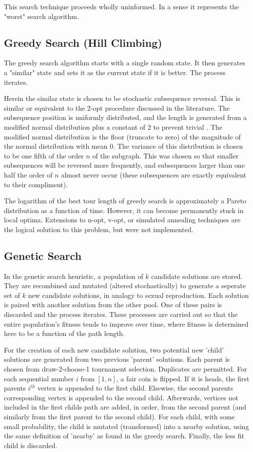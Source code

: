 \documentclass[10pt, conference, compsocconf]{IEEEtran}
\begin{document}
This search technique proceeds wholly uninformed. In a sense it represents the "worst" search algorithm.

\subsection{Greedy Search (Hill Climbing)}
The greedy search algorithm starts with a single random state. It then generates a "similar" state and sets it as the current state if it is better. The process iterates. 

Herein the similar state is chosen to be stochastic subsequence reversal. This is similar or equivalent to the 2-opt procedure discussed in the literature. The subsequence position is uniformly distributed, and the length is generated from a modified normal distribution plus a constant of $2$ to prevent trivial . The modified normal distribution is the floor (truncate to zero) of the magnitude of the normal distribution with mean $0$. The variance of this distribution is chosen to be one fifth of the order $n$ of the subgraph. This was chosen so that smaller subsequences will be reversed more frequently, and subsequences larger than one half the order of $n$ almost never occur (these subsequences are exactly equivalent to their compliment). 

The logarithm of the best tour length of greedy search is approximately a Pareto distribution as a function of time. However, it can become permanently stuck in local optima. Extensions to n-opt, v-opt, or simulated annealing techniques are the logical solution to this problem, but were not implemented. 

\subsection{Genetic Search}
In the genetic search heuristic, a population of $k$ candidate solutions are stored. They are recombined and mutated (altered stochastically) to generate a seperate set of $k$ new candidate solutions, in analogy to sexual reproduction. Each solution is paired with another solution from the other pool. One of these pairs is discarded and the process iterates. These processes are carried out so that the entire population's fitness tends to improve over time, where fitness is determined here to be a function of the path length.

For the creation of each new candidate solution, two potential new 'child' solutions are generated from two previous 'parent' solutions. Each parent is chosen from draw-2-choose-1 tournament selection. Duplicates are permitted. For each sequential number $i$ from $[1,n]$, a fair coin is flipped. If it is heads, the first parents $i^{th}$ vertex is appended to the first child. Elsewise, the second parents corresponding vertex is appended to the second child. Afterwards, vertices not included in the first childs path are added, in order, from the second parent (and similarly from the first parent to the second child). For each child, with some small probability, the child is mutated (transformed) into a nearby solution, using the same definition of 'nearby' as found in the greedy search. Finally, the less fit child is discarded.
\end{document}

